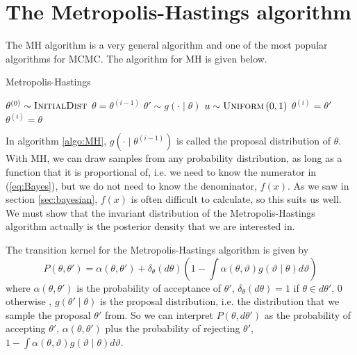 \section{The Metropolis-Hastings algorithm}\label{subsec:mh}
The MH algorithm is a very general algorithm and one of the most popular algorithms for MCMC. 
The algorithm for MH is given below.
\begin{algorithm}[H]
    \caption{Metropolis-Hastings}
    \label{algo:MH}
    \begin{algorithmic}[1] %
        \State $\theta^{\left(0\right)} \sim \textsc{InitialDist}$ 
        \State $\theta = \theta^{\left(i - 1\right)}$
        \State$\theta' \sim g\left(\cdot \mid \theta\right)$
        \State $u\sim \textsc{Uniform}\left(0,1\right)$
         \label{state:accept_reject_MH}
        \State $\theta^{\left(i\right)} = \theta'$
        \Else 
        \State $\theta^{\left(i\right)} = \theta$
         \EndIf
         \EndFor
    \end{algorithmic}
\end{algorithm}
In algorithm \ref{algo:MH}, $g\left(\cdot \mid \theta^{\left(i-1\right)}\right)$ is called the proposal distribution of $\theta$. 
With MH, we can draw samples from any probability distribution, as long as a function that it is proportional of, i.e. we need to know the numerator in (\ref{eq:Bayes}), but we do not need to know the denominator, $f\left(x\right)$.
As we saw in section \ref{sec:bayesian}, $f\left(x\right)$ is often difficult to calculate, so this suits us well. 
We must show that the invariant distribution of the Metropolis-Hastings algorithm actually is the posterior density that we are interested in.

The transition kernel for the Metropolis-Hastings algorithm is given by
\begin{equation}
    P\left(\theta, \theta'\right) = \alpha\left(\theta, \theta'\right) + \delta_{\theta} \left(d\theta\right)\left(1 - \int \alpha\left(\theta, \vartheta\right)g\left(\vartheta\mid \theta\right) d \vartheta \right)
\end{equation}
where $\alpha\left(\theta, \theta'\right)$ is the probability of acceptance of $\theta'$, $\delta_{\theta}\left(d\theta\right) = 1$ if  $\theta \in d\theta'$, $0$ otherwise \cite{chib1995understanding},  $g\left(\theta'\mid \theta\right)$ is the proposal distribution, i.e. the distribution that we sample the proposal $\theta'$ from. 
So we can interpret $P\left(\theta , d\theta'\right)$ as the probability of accepting $\theta'$,  $\alpha\left(\theta, \theta'\right)$ plus the probability of rejecting $\theta'$, 
$1 - \int \alpha\left(\theta, \vartheta\right) g\left(\vartheta\mid \theta \right) d\vartheta$. 
